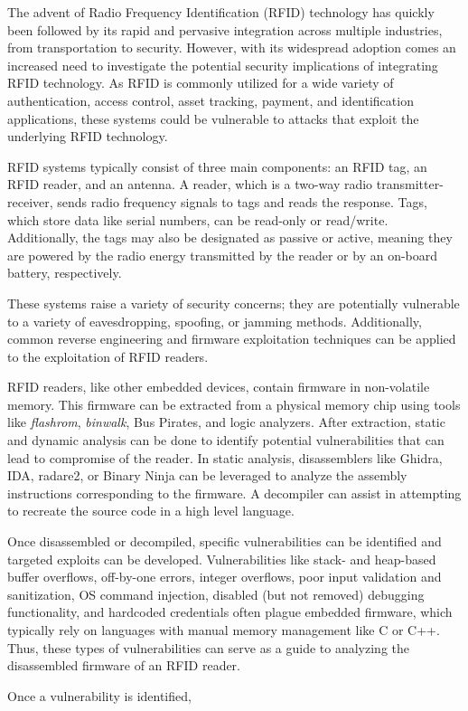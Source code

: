 
The advent of Radio Frequency Identification (RFID) technology has quickly been followed by its rapid and pervasive integration across multiple industries, from transportation to security. However, with its widespread adoption comes an increased need to investigate the potential security implications of integrating RFID technology. As RFID is commonly utilized for a wide variety of authentication, access control, asset tracking, payment, and identification applications, these systems could be vulnerable to attacks that exploit the underlying RFID technology. 

RFID systems typically consist of three main components: an RFID tag, an RFID reader, and an antenna. A reader, which is a two-way radio transmitter-receiver, sends radio frequency signals to tags and reads the response. Tags, which store data like serial numbers, can be read-only or read/write. Additionally, the tags may also be designated as passive or active, meaning they are powered by the radio energy transmitted by the reader or by an on-board battery, respectively.

These systems raise a variety of security concerns; they are potentially vulnerable to a variety of eavesdropping, spoofing, or jamming methods. Additionally, common reverse engineering and firmware exploitation techniques can be applied to the exploitation of RFID readers. 

RFID readers, like other embedded devices, contain firmware in non-volatile memory. This firmware can be extracted from a physical memory chip using tools like \textit{flashrom}, \textit{binwalk}, Bus Pirates, and logic analyzers. After extraction, static and dynamic analysis can be done to identify potential vulnerabilities that can lead to compromise of the reader. In static analysis, disassemblers like Ghidra, IDA, radare2, or Binary Ninja can be leveraged to analyze the assembly instructions corresponding to the firmware. A decompiler can assist in attempting to recreate the source code in a high level language.  

Once disassembled or decompiled, specific vulnerabilities can be identified and targeted exploits can be developed. Vulnerabilities like stack- and heap-based buffer overflows, off-by-one errors, integer overflows, poor input validation and sanitization, OS command injection, disabled (but not removed) debugging functionality, and hardcoded credentials often plague embedded firmware, which typically rely on languages with manual memory management like C or C++. Thus, these types of vulnerabilities can serve as a guide to analyzing the disassembled firmware of an RFID reader. 

Once a vulnerability is identified, 